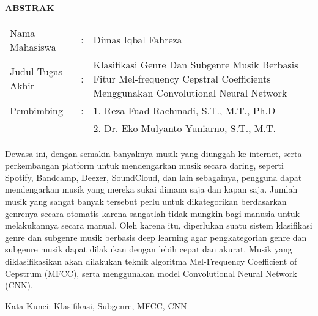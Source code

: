 \begin{center}
  \large\textbf{ABSTRAK}
\end{center}


\vspace{2ex}

\begingroup
  \setlength{\tabcolsep}{0pt}

  \noindent
  \begin{tabularx}{\textwidth}{l >{\centering}m{2em} X}
    Nama Mahasiswa    &:& Dimas Iqbal Fahreza \\

    Judul Tugas Akhir &:&	Klasifikasi Genre Dan Subgenre Musik Berbasis Fitur Mel-frequency Cepstral Coefficients Menggunakan Convolutional Neural Network \\

    Pembimbing        &:& 1. Reza Fuad Rachmadi, S.T., M.T., Ph.D \\
                      & & 2. Dr. Eko Mulyanto Yuniarno, S.T., M.T. \\
  \end{tabularx}
\endgroup

Dewasa ini, dengan semakin banyaknya musik yang diunggah ke internet, serta 
perkembangan platform untuk mendengarkan musik secara daring, seperti Spotify, 
Bandcamp, Deezer, SoundCloud, dan lain sebagainya, pengguna dapat mendengarkan musik 
yang mereka sukai dimana saja dan kapan saja. Jumlah musik yang sangat banyak tersebut 
perlu untuk dikategorikan berdasarkan genrenya secara otomatis karena sangatlah tidak 
mungkin bagi manusia untuk melakukannya secara manual. Oleh karena itu, diperlukan 
suatu sistem klasifikasi genre dan subgenre musik berbasis deep learning agar pengkategorian genre dan subgenre musik dapat dilakukan dengan lebih cepat dan akurat. Musik yang diklasifikasikan akan dilakukan 
teknik algoritma Mel-Frequency Coefficient of Cepstrum (MFCC), serta menggunakan model 
Convolutional Neural Network (CNN). 

Kata Kunci: Klasifikasi, Subgenre, MFCC, CNN
